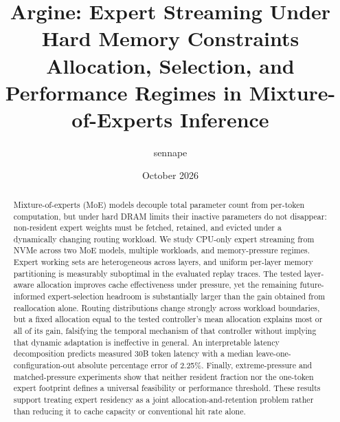 \documentclass[11pt]{article}
\title{\textbf{Argine: Expert Streaming Under Hard Memory Constraints}\\
\large Allocation, Selection, and Performance Regimes in Mixture-of-Experts Inference}
\author{sennape}
\date{October 2026}
\begin{document}
\maketitle

\begin{abstract}
Mixture-of-experts (MoE) models decouple total parameter count from per-token computation, but under hard DRAM limits their inactive parameters do not disappear: non-resident expert weights must be fetched, retained, and evicted under a dynamically changing routing workload. We study CPU-only expert streaming from NVMe across two MoE models, multiple workloads, and memory-pressure regimes. Expert working sets are heterogeneous across layers, and uniform per-layer memory partitioning is measurably suboptimal in the evaluated replay traces. The tested layer-aware allocation improves cache effectiveness under pressure, yet the remaining future-informed expert-selection headroom is substantially larger than the gain obtained from reallocation alone. Routing distributions change strongly across workload boundaries, but a fixed allocation equal to the tested controller's mean allocation explains most or all of its gain, falsifying the temporal mechanism of that controller without implying that dynamic adaptation is ineffective in general. An interpretable latency decomposition predicts measured 30B token latency with a median leave-one-configuration-out absolute percentage error of 2.25\%. Finally, extreme-pressure and matched-pressure experiments show that neither resident fraction nor the one-token expert footprint defines a universal feasibility or performance threshold. These results support treating expert residency as a joint allocation-and-retention problem rather than reducing it to cache capacity or conventional hit rate alone.
\end{abstract}
















\end{document}
